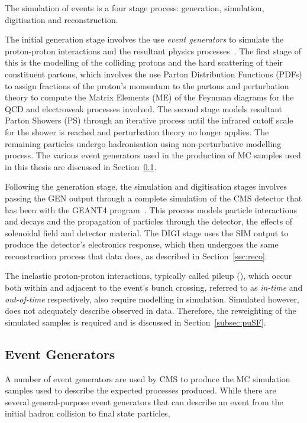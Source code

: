 The simulation of events is a four stage process: generation, simulation, digitisation and reconstruction.

The initial generation stage involves the use \emph{event generators} to simulate the proton-proton interactions and the resultant physics processes~\cite{Buckley:2011ms,Hoche:2014rga}.
The first stage of this is the modelling of the colliding protons and the hard scattering of their constituent partons, which involves the use Parton Distribution Functions (PDFs) to assign fractions of the proton's momentum to the partons and perturbation theory to compute the Matrix Elements (ME) of the Feynman diagrams for the QCD and electroweak processes involved.
The second stage models resultant Parton Showers (PS) through an iterative process until the infrared cutoff scale for the shower is reached and perturbation theory no longer applies.
The remaining particles undergo hadronisation using non-perturbative modelling process.
The various event generators used in the production of MC samples used in this thesis are discussed in Section~\ref{subsec:eventGenerators}.

Following the generation stage, the simulation and digitisation stages involves passing the GEN output through a complete simulation of the CMS detector that has been with the GEANT4 program~\cite{geant4,Lefebure:1999wja}.
This process models particle interactions and decays and the propagation of particles through the detector, the effects of solenoidal field and detector material.
The DIGI stage uses the SIM output to produce the detector's electronics response, which then undergoes the same reconstruction process that data does, as described in Section~\ref{sec:reco}.

The inelastic proton-proton interactions, typically called pileup (\PU), which occur both within and adjacent to the event's bunch crossing, referred to as \emph{in-time} and \emph{out-of-time} \PU  respectively, also require modelling in simulation.
Simulated \PU however, does not adequately describe observed \PU in data.
Therefore, the reweighting of the simulated samples is required and is discussed in Section~\ref{subsec:puSF}.

\subsection{Event Generators}\label{subsec:eventGenerators}
A number of event generators are used by CMS to produce the MC simulation samples used to describe the expected processes produced.
While there are several general-purpose event generators that can describe an event from the initial hadron collision to final state particles, 

